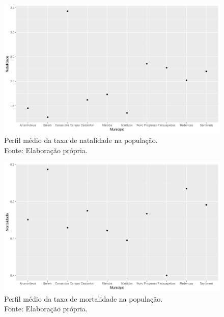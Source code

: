 \documentclass[a4paper, 10pt]{article}
\begin{document}
 \begin{figure}[H]
	\centering 
	\includegraphics[scale=0.48]{NATALIDADE.png}
	\caption{\centering Perfil médio da taxa de natalidade na população. \\ Fonte: Elaboração própria.}
	\label{}
	\end{figure}

 \begin{figure}[H]
	\centering 
	\includegraphics[scale=0.48]{MORTALIDADE.png}
	\caption{\centering Perfil médio da taxa de mortalidade na população. \\ Fonte: Elaboração própria.}
	\label{}
	\end{figure}
\end{document}
